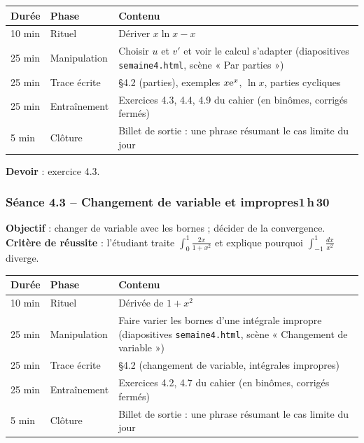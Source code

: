 \documentclass[10.5pt,a4paper]{article}
\newif\ifprof
\newcommand{\profonly}[1]{\ifprof #1\fi}
\begin{document}
\begin{longtable}{@{}p{1.1cm}p{2.4cm}p{12.4cm}@{}}
\toprule \textbf{Durée} & \textbf{Phase} & \textbf{Contenu}\\ \midrule\endhead
10 min & Rituel & Dériver $x\ln x-x$\\
25 min & Manipulation & Choisir $u$ et $v'$ et voir le calcul s'adapter (diapositives \texttt{semaine4.html}, scène « Par parties »)\\
25 min & Trace écrite & \S4.2 (parties), exemples $x\mathrm{e}^x$, $\ln x$, parties cycliques\\
25 min & Entraînement & Exercices 4.3, 4.4, 4.9 du cahier (en binômes, corrigés fermés)\\
5 min & Clôture & Billet de sortie : une phrase résumant le cas limite du jour\\ \bottomrule\end{longtable}\nopagebreak
\textbf{Devoir} : exercice 4.3.\profonly{ \textbf{Point de vigilance} : Le polynôme joue $u$ ; $\ln x$ seul s'intègre avec $v'=1$.}\par
{}\subsubsection*{\textcolor{marine}{Séance 4.3 -- Changement de variable et impropres}\hfill\normalfont\small\textcolor{ardoise}{1\,h\,30}}
\begin{objectif}\textbf{Objectif} : changer de variable avec les bornes ; décider de la convergence.\\\textbf{Critère de réussite} : l'étudiant traite $\int_0^1\frac{2x}{1+x^2}$ et explique pourquoi $\int_{-1}^1\frac{dx}{x^2}$ diverge.\end{objectif}\nopagebreak
\begin{longtable}{@{}p{1.1cm}p{2.4cm}p{12.4cm}@{}}
\toprule \textbf{Durée} & \textbf{Phase} & \textbf{Contenu}\\ \midrule\endhead
10 min & Rituel & Dérivée de $1+x^2$\\
25 min & Manipulation & Faire varier les bornes d'une intégrale impropre (diapositives \texttt{semaine4.html}, scène « Changement de variable »)\\
25 min & Trace écrite & \S4.2 (changement de variable, intégrales impropres)\\
25 min & Entraînement & Exercices 4.2, 4.7 du cahier (en binômes, corrigés fermés)\\
5 min & Clôture & Billet de sortie : une phrase résumant le cas limite du jour\\ \bottomrule\end{longtable}\nopagebreak
\end{document}
